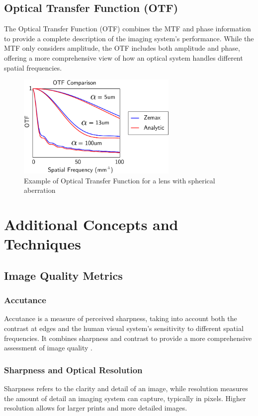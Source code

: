 \subsection{Optical Transfer Function (OTF)}
The Optical Transfer Function (OTF) combines the MTF and phase information to provide a complete description of the imaging system's performance. While the MTF only considers amplitude, the OTF includes both amplitude and phase, offering a more comprehensive view of how an optical system handles different spatial frequencies.

\begin{figure}[h]
\centering
\includegraphics[height=5cm]{Images/OTF_example.png}
\caption{Example of Optical Transfer Function for a lens with spherical aberration \cite{OTFimage}}
\label{fig:otf}
\end{figure}

\section{Additional Concepts and Techniques}

\subsection{Image Quality Metrics}

\subsubsection{Accutance}
Accutance is a measure of perceived sharpness, taking into account both the contrast at edges and the human visual system's sensitivity to different spatial frequencies. It combines sharpness and contrast to provide a more comprehensive assessment of image quality \cite{accutance} .

\subsubsection{Sharpness and Optical Resolution}
Sharpness refers to the clarity and detail of an image, while resolution measures the amount of detail an imaging system can capture, typically in pixels. Higher resolution allows for larger prints and more detailed images.

